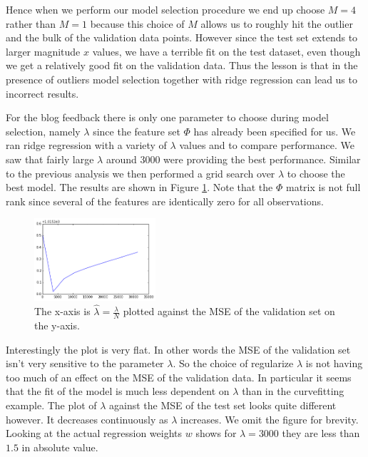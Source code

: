 \documentclass[10pt]{article}
\begin{document}
%
%
%
Hence when we perform our model selection procedure we end up choose $M = 4$ rather than $M = 1$ because this choice of $M$ allows us to roughly hit the outlier and the bulk of the validation data points. However since the test set extends to larger magnitude $x$ values, we have a terrible fit on the test dataset, even though we get a relatively good fit on the validation data. Thus the lesson is that in the presence of outliers model selection together with ridge regression can lead us to incorrect results.
%
%

For the blog feedback there is only one parameter to choose during model selection, namely $\lambda$ since the feature set $\Phi$ has already been specified for us. We ran ridge regression with a variety of $\lambda$ values and to compare performance. We saw that fairly large $\lambda$ around $3000$ were providing the best performance. Similar to the previous analysis we then performed a grid search over $\lambda$ to choose the best model. The results are shown in Figure \ref{blog-model-selection}. Note that the $\Phi$ matrix is not full rank since several of the features are identically zero for all observations.
%

%
%
%
\begin{figure}[h]
\centering
\includegraphics[width=0.4\textwidth]{blog-model-selection}
\caption{The x-axis is $\hat{\lambda} = \frac{\lambda}{N}$ plotted against the MSE of the validation set on the y-axis.}
\label{blog-model-selection}
\end{figure}
%
Interestingly the plot is very flat. In other words the MSE of the validation set isn't very sensitive to the parameter $\lambda$.  So the choice of regularize $\lambda$ is not having too much of an effect on the MSE of the validation data. In particular it seems that the fit of the model is much less dependent on $\lambda$ than in the curvefitting example.  The plot of $\lambda$ against the MSE of the test set looks quite different however. It decreases continuously as $\lambda$ increases. We omit the figure for brevity.
%
Looking at the actual regression weights $w$ shows for $\lambda = 3000$ they are less than $1.5$ in absolute value.
\end{document}
